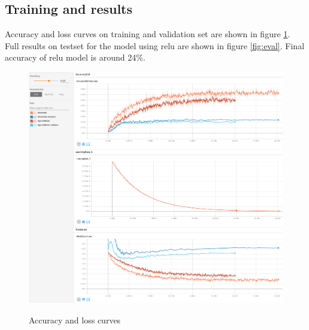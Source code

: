 ﻿\documentclass[a4paper]{article}
\begin{document}
\subsection{Training and results}
Accuracy and loss curves on training and validation set are shown in figure \ref{fig:training}.
Full results on testset for the model using relu are shown in figure \ref{fig:eval}.
Final accuracy of relu model is around 24\%.

\begin{figure}[H]
    \caption[]{Accuracy and loss curves}
    \centering
    \includegraphics[page=2,width=1.0\textwidth]{training.png}
    \label{fig:training}
\end{figure}
\end{document}
